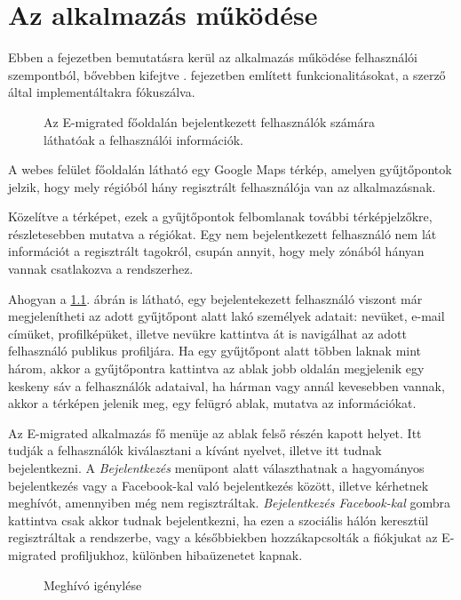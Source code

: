 \chapter{Az alkalmazás működése}
\label{ch:mukodes}
Ebben a fejezetben bemutatásra kerül az alkalmazás működése felhasználói szempontból, bővebben kifejtve . fejezetben említett funkcionalitásokat, a szerző által implementáltakra fókuszálva. 
\begin{figure}
  \centering
  \caption{Az E-migrated főoldalán bejelentkezett felhasználók számára láthatóak a felhasználói információk.}
  \label{fig:emigrated_terkep}
\end{figure}


A webes felület főoldalán látható egy Google Maps térkép, amelyen gyűjtőpontok jelzik, hogy mely régióból hány regisztrált felhasználója van az alkalmazásnak.

Közelítve a térképet, ezek a gyűjtőpontok felbomlanak további térképjelzőkre, részletesebben mutatva a régiókat. Egy nem bejelentkezett felhasználó nem lát információt a regisztrált tagokról, csupán annyit, hogy mely zónából hányan vannak csatlakozva a rendszerhez. 


Ahogyan a \ref{fig:emigrated_terkep}. ábrán is látható, egy bejelentekezett felhasználó viszont már megjelenítheti az adott gyűjtőpont alatt lakó személyek adatait: nevüket, e-mail címüket, profilképüket, illetve nevükre kattintva át is navigálhat az adott felhasználó publikus profiljára. Ha egy gyűjtőpont alatt többen laknak mint három, akkor a gyűjtőpontra kattintva az ablak jobb oldalán megjelenik egy keskeny sáv a felhasználók adataival, ha hárman vagy annál kevesebben vannak, akkor a térképen jelenik meg, egy felügró ablak, mutatva az információkat. 


Az E-migrated alkalmazás fő menüje az ablak felső részén kapott helyet. Itt tudják a felhasználók kiválasztani a kívánt nyelvet, illetve itt tudnak bejelentkezni. A \textit{Bejelentkezés} menüpont alatt választhatnak a hagyományos bejelentkezés vagy a Facebook-kal való bejelentkezés között, illetve kérhetnek meghívót, amennyiben még nem regisztráltak. \textit{Bejelentkezés Facebook-kal} gombra kattintva csak akkor tudnak bejelentkezni, ha ezen a szociális hálón keresztül regisztráltak a rendszerbe, vagy a későbbiekben hozzákapcsolták a fiókjukat az E-migrated profiljukhoz, különben hibaüzenetet kapnak. 
\begin{figure}
  \centering
  \caption{Meghívó igénylése}
  \label{fig:emigrated_meghivo_igenyles}
\end{figure}

